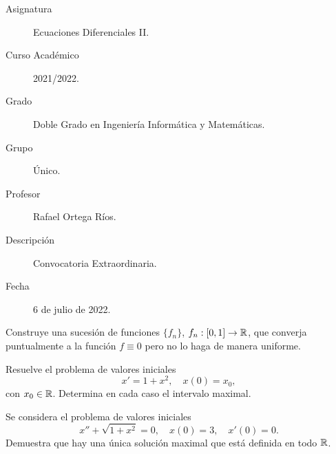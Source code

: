 \documentclass[12pt]{article}
\begin{document}

    
    

    \begin{description}
        \item[Asignatura] Ecuaciones Diferenciales II.
        \item[Curso Académico] 2021/2022.
        \item[Grado] Doble Grado en Ingeniería Informática y Matemáticas.
        \item[Grupo] Único.
        \item[Profesor] Rafael Ortega Ríos.
        \item[Descripción] Convocatoria Extraordinaria.
        \item[Fecha] 6 de julio de 2022.
    
    \end{description}
    \newpage


    
    \begin{ejercicio}
        Construye una sucesión de funciones $\{f_n\}$, $f_n : \left[0, 1\right] \to \mathbb{R}$, que converja puntualmente a la función $f \equiv 0$ pero no lo haga de manera uniforme.
    \end{ejercicio}

    \begin{ejercicio}
        Resuelve el problema de valores iniciales
        \[
        x' = 1 + x^2, \quad x(0) = x_0,
        \]
        con $x_0 \in \mathbb{R}$. Determina en cada caso el intervalo maximal.
    \end{ejercicio}

    \begin{ejercicio}
        Se considera el problema de valores iniciales
        \[
        x'' + \sqrt{1 + x^2} = 0, \quad x(0) = 3, \quad x'(0) = 0.
        \]
        Demuestra que hay una única solución maximal que está definida en todo $\mathbb{R}$.
    \end{ejercicio}
\end{document}
